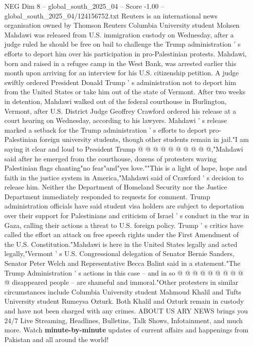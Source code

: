 \begin{textsample}{NEG Dim 8 – global\_south\_2025\_04 – Score -1.00 – global\_south\_2025\_04/124156752.txt}  \label{ex:f8_neg_281}
Reuters is an international news organisation owned by Thomson Reuters Columbia University student Mohsen Mahdawi was released from U.S. immigration custody on Wednesday, after a judge ruled he should be free on bail to challenge the Trump administration ' s efforts to deport him over his participation in pro-Palestinian protests.
Mahdawi, born and raised in a refugee camp in the West Bank, was arrested earlier this month upon arriving for an interview for his U.S. citizenship petition.
A judge swiftly ordered President Donald Trump ' s administration not to deport him from the United States or take him out of the state of Vermont.
After two weeks in detention, Mahdawi walked out of the federal courthouse in Burlington, Vermont, after U.S.
District Judge Geoffrey Crawford ordered his release at a court hearing on Wednesday, according to his lawyers.
Mahdawi ' s release marked a setback for the Trump administration ' s efforts to deport pro-Palestinian foreign university students, though other students remain in jail."I am saying it clear and loud to President Trump @ @ @ @ @ @ @ @ @ @,"Mahdawi said after he emerged from the courthouse, dozens of protesters waving Palestinian flags chanting"no fear"and"yes love.""This is a light of hope, hope and faith in the justice system in America,"Mahdawi said of Crawford ' s decision to release him.
Neither the Department of Homeland Security nor the Justice Department immediately responded to requests for comment.
Trump administration officials have said student visa holders are subject to deportation over their support for Palestinians and criticism of Israel ' s conduct in the war in Gaza, calling their actions a threat to U.S. foreign policy.
Trump ' s critics have called the effort an attack on free speech rights under the First Amendment of the U.S.
Constitution."Mahdawi is here in the United States legally and acted legally,"Vermont ' s U.S.
Congressional delegation of Senator Bernie Sanders, Senator Peter Welch and Representative Becca Balint said in a statement."The Trump Administration ' s actions in this case -- and in so @ @ @ @ @ @ @ @ @ @ disappeared people -- are shameful and immoral."Other protesters in similar circumstances include Columbia University student Mahmoud Khalil and Tufts University student Rumeysa Ozturk.
Both Khalil and Ozturk remain in custody and have not been charged with any crimes.
ABOUT US ARY NEWS brings you 24/7 Live Streaming, Headlines, Bulletins, Talk Shows, Infotainment, and much more.
Watch \textbf{minute-by-minute} updates of current affairs and happenings from Pakistan and all around the world!

\end{textsample}
